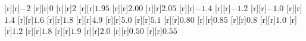 \begin{psfrags}
%
[r][r]{$-2$}%
[r][r]{$0$}%
[r][r]{$2$}%
[r][r]{$1.95$}%
[r][r]{$2.00$}%
[r][r]{$2.05$}%
[r][r]{$-1.4$}%
[r][r]{$-1.2$}%
[r][r]{$-1.0$}%
[r][r]{$1.4$}%
[r][r]{$1.6$}%
[r][r]{$1.8$}%
[r][r]{$4.9$}%
[r][r]{$5.0$}%
[r][r]{$5.1$}%
[r][r]{$0.80$}%
[r][r]{$0.85$}%
[r][r]{$0.8$}%
[r][r]{$1.0$}%
[r][r]{$1.2$}%
[r][r]{$1.8$}%
[r][r]{$1.9$}%
[r][r]{$2.0$}%
[r][r]{$0.50$}%
[r][r]{$0.55$}%
%
%
\end{psfrags}%
%
